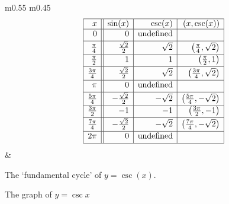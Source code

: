 \noindent\hskip-10pt\begin{minipage}{\textwidth}
\begin{center}
\begin{tabular}{m{} m{}}
\setlength{\extrarowheight}{2pt}
\[ \begin{array}{|r||r|r|r|}  

\hline

 x & \sin(x) & \csc(x) & (x,\csc(x)) \\ \hline
0  & 0 & \text{undefined} &  \\ [2pt]   \hline
\frac{\pi}{4}  & \frac{\sqrt{2}}{2} & \sqrt{2} & \left(\frac{\pi}{4}, \sqrt{2} \right) \\ [2pt] \hline 
\frac{\pi}{2}  & 1 & 1 & \left(\frac{\pi}{2}, 1 \right) \\ [2pt] \hline 
\frac{3\pi}{4}  & \frac{\sqrt{2}}{2} & \sqrt{2} & \left(\frac{3\pi}{4}, \sqrt{2} \right) \\ [2pt] \hline 
\pi & 0 & \text{undefined} &   \\ [2pt] \hline 
\frac{5\pi}{4}  & -\frac{\sqrt{2}}{2} & -\sqrt{2} & \left(\frac{5\pi}{4}, -\sqrt{2} \right) \\ [2pt] \hline 
\frac{3\pi}{2}  & -1 & -1 & \left(\frac{3\pi}{2},-1 \right)\\ [2pt] \hline 
\frac{7\pi}{4}  & -\frac{\sqrt{2}}{2} & -\sqrt{2} & \left(\frac{7\pi}{4}, -\sqrt{2} \right) \\ [2pt] \hline 
2\pi  & 0 & \text{undefined} &  \\  [2pt] \hline
\end{array} \] \setlength{\extrarowheight}{0pt} &
\end{tabular}
\end{center}
\captionsetup{type=figure}
\caption{The `fundamental cycle' of $y = \csc(x)$.}\label{fig:cscgraph1}
\end{minipage}

\medskip


\medskip

\noindent\begin{minipage}{\textwidth}
\begin{center}
\end{center}
\captionsetup{type=figure}
\caption{The graph of $y=\csc{x}$}\label{fig:cscgraph2}
\end{minipage}

